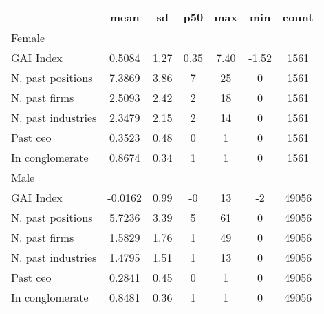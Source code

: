 {
\def\sym#1{\ifmmode^{#1}\else\(^{#1}\)\fi}
\begin{tabular}{l*{1}{cccccc}}
\hline\hline
                    &        mean&          sd&         p50&         max&         min&       count\\
\hline
Female              &            &            &            &            &            &            \\
GAI Index           &      0.5084&        1.27&        0.35&        7.40&       -1.52&        1561\\
N. past positions   &      7.3869&        3.86&           7&          25&           0&        1561\\
N. past firms       &      2.5093&        2.42&           2&          18&           0&        1561\\
N. past industries  &      2.3479&        2.15&           2&          14&           0&        1561\\
Past ceo            &      0.3523&        0.48&           0&           1&           0&        1561\\
In conglomerate     &      0.8674&        0.34&           1&           1&           0&        1561\\
\hline
Male                &            &            &            &            &            &            \\
GAI Index           &     -0.0162&        0.99&          -0&          13&          -2&       49056\\
N. past positions   &      5.7236&        3.39&           5&          61&           0&       49056\\
N. past firms       &      1.5829&        1.76&           1&          49&           0&       49056\\
N. past industries  &      1.4795&        1.51&           1&          13&           0&       49056\\
Past ceo            &      0.2841&        0.45&           0&           1&           0&       49056\\
In conglomerate     &      0.8481&        0.36&           1&           1&           0&       49056\\
\hline\hline
\end{tabular}
}
